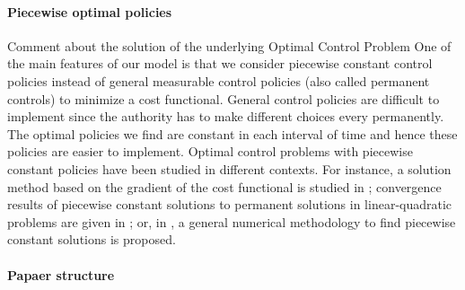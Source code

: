 \paragraph{Piecewise optimal policies}
        Comment about the solution of the underlying Optimal Control Problem
    One of the main features of our model is that we consider piecewise
    constant control policies instead of general measurable control policies
    (also called permanent controls) to minimize a cost functional. General
    control policies are difficult to implement since the authority has to make
    different choices every permanently. The optimal policies we find are
    constant in each interval of time and hence these policies are easier to
    implement.
        Optimal control problems with piecewise constant policies have been
    studied in different contexts. For instance, a solution method based on the
    gradient of the cost functional is studied in \cite{MR3223602}; convergence
    results of piecewise constant solutions to permanent solutions in
    linear-quadratic problems are given in \cite{MR3627992}; or, in
    \cite{CANTUNetAl}, a general numerical methodology to find piecewise
    constant solutions is proposed.
\paragraph{Papaer structure}